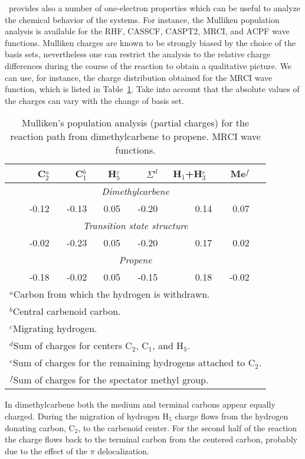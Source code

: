 
\molcas\ provides also a number of one-electron properties
which can be useful to analyze the chemical behavior of the systems.
For instance, the Mulliken population analysis is available for the
RHF, CASSCF, CASPT2, MRCI, and ACPF wave functions. Mulliken charges
are known to be strongly biased by the choice of the basis sets,
nevertheless one can restrict the analysis to the relative charge
differences during the course of the reaction to obtain a qualitative
picture. We can use, for instance, the charge distribution obtained
for the MRCI wave function, which is listed in Table~\ref{tab:Mq}.
Take into account that the absolute values of the charges can 
vary with the change of basis set.

\begin{table}[hp]
\begin{center}
\caption{\label{tab:Mq}Mulliken's population analysis (partial charges) for the reaction path from dimethylcarbene to propene. MRCI wave functions.}
\begin{tabular}{rrrrrrrr} 
\\ \hline \hline
 &   C$_2^a$  &   C$_1^b$  &   H$_5^c$ & $\Sigma^d$ & \multicolumn{1}{c}{H$_1$+H$_3^e$} & Me$^f$ \\ 
\hline
\multicolumn{8}{c}{\it Dimethylcarbene} \\
 & -0.12 & -0.13 &  0.05 & -0.20    &  0.14   &  0.07 \\
\hline
\multicolumn{8}{c}{\it Transition state structure} \\
 & -0.02 & -0.23 &  0.05 & -0.20    &  0.17   &  0.02 \\
\hline
\multicolumn{8}{c}{\it Propene} \\
 & -0.18 & -0.02 &  0.05 & -0.15    &  0.18   & -0.02 \\ 
\hline
\multicolumn{8}{l}{\footnotesize{$^a$Carbon from which the hydrogen is withdrawn.}}\\
\multicolumn{8}{l}{\footnotesize{$^b$Central carbenoid carbon.}}\\
\multicolumn{8}{l}{\footnotesize{$^c$Migrating hydrogen.}}\\
\multicolumn{8}{l}{\footnotesize{$^d$Sum of charges for centers C$_2$, C$_1$, and H$_5$.}}\\
\multicolumn{8}{l}{\footnotesize{$^e$Sum of charges for the remaining hydrogens attached to C$_2$.}}\\
\multicolumn{8}{l}{\footnotesize{$^f$Sum of charges for the spectator methyl group.}}
\end{tabular}
\end{center}
\end{table}

In dimethylcarbene both the medium and terminal carbons appear equally charged.
During the migration of hydrogen H$_5$ charge flows from the hydrogen donating
carbon, C$_2$, to the carbenoid center. For the second half of the reaction
the charge flows back to the terminal carbon from the centered carbon, probably
due to the effect of the $\pi$ delocalization.
